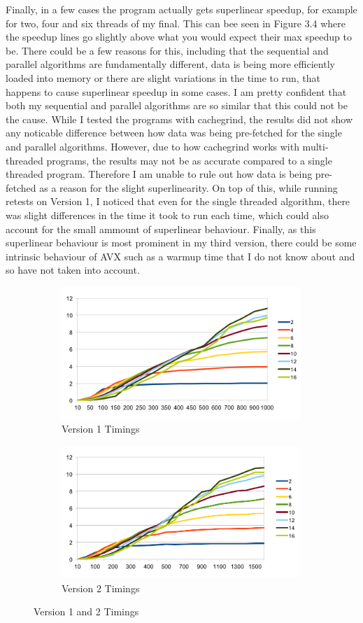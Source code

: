 \documentclass{report}
\begin{document}
Finally, in a few cases the program actually gets superlinear speedup, for example for two, four and six threads of my final. This can bee seen in Figure 3.4 where the speedup lines go slightly above what you would expect their max speedup to be. There could be a few reasons for this, including that the sequential and parallel algorithms are fundamentally different, data is being more efficiently loaded into memory or there are slight variations in the time to run, that happens to cause superlinear speedup in some cases. I am pretty confident that both my sequential and parallel algorithms are so similar that this could not be the cause. While I tested the programs with cachegrind, the results did not show any noticable difference between how data was being pre-fetched for the single and parallel algorithms. However, due to how cachegrind works with multi-threaded programs, the results may not be as accurate compared to a single threaded program. Therefore I am unable to rule out how data is being pre-fetched as a reason for the slight superlinearity. On top of this, while running retests on Version 1, I noticed that even for the single threaded algorithm, there was slight differences in the time it took to run each time, which could also account for the small ammount of superlinear behaviour. Finally, as this superlinear behaviour is most prominent in my third version, there could be some intrinsic behaviour of AVX such as a warmup time that I do not know about and so have not taken into account.
\begin{figure}[h]
\begin{subfigure}{0.5\textwidth}
\includegraphics[width=1\linewidth, height=5cm]{V1-Speedup} 
\caption{Version 1 Timings}
\label{fig:subim4}
\end{subfigure}
\begin{subfigure}{0.5\textwidth}
\includegraphics[width=1\linewidth, height=5cm]{V2-Speedup} 
\caption{Version 2 Timings}
\label{fig:subim5}
\end{subfigure}
\caption{Version 1 and 2 Timings}
\end{figure}
\end{document}
